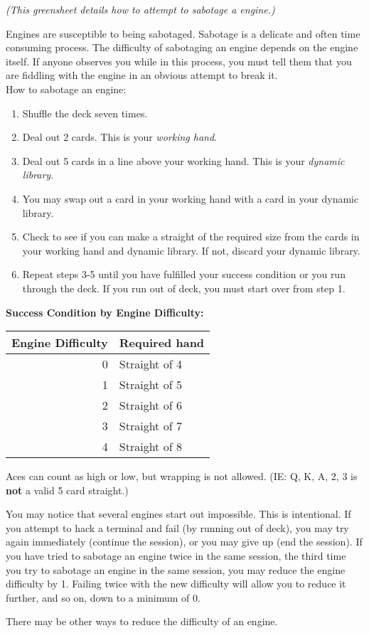 \documentclass[green]{guildcamp4}
\begin{document}
\name{\gSabotage{}}

\emph{(This greensheet details how to attempt to sabotage a engine.)}

Engines are susceptible to being sabotaged. Sabotage is a delicate and often time consuming process. The difficulty of sabotaging an engine depends on the engine itself. If anyone observes you while in this process, you must tell them that you are fiddling with the engine in an obvious attempt to break it.\\

How to sabotage an engine:
\begin{enumerate}
	\item Shuffle the deck seven times.
	\item Deal out 2 cards. This is your {\em working hand}.
	\item Deal out 5 cards in a line above your working hand. This is your {\em dynamic library}.
	\item You may swap out a card in your working hand with a card in your dynamic library.
	\item Check to see if you can make a straight of the required size from the cards in your working hand and dynamic library. If not, discard your dynamic library.
	\item Repeat steps 3-5 until you have fulfilled your success condition or you run through the deck.  If you run out of deck, you must start over from step 1.
\end{enumerate}

{\bf Success Condition by Engine Difficulty:}\\

\begin{tabular}{||r|l||}
	\hline\hline
	Engine Difficulty	& Required hand\\
	\hline
	0	& Straight of 4\\
	1	& Straight of 5\\
	2	& Straight of 6\\
	3	& Straight of 7\\
	4	& Straight of 8\\
	\hline\hline 
\end{tabular}

\vspace{10 mm}

Aces can count as high or low, but wrapping is not allowed. (IE: Q, K, A, 2, 3 is {\bf not} a valid 5 card straight.)

You may notice that several engines start out impossible. This is intentional. If you attempt to hack a terminal and fail (by running out of deck), you may try again immediately (continue the session), or you may give up (end the session). If you have tried to sabotage an engine twice in the same session, the third time you try to sabotage an engine in the same session, you may reduce the engine difficulty by 1. Failing twice with the new difficulty will allow you to reduce it further, and so on, down to a minimum of 0.

There may be other ways to reduce the difficulty of an engine.
\end{document}
